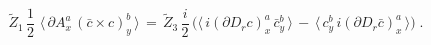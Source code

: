 \begin{equation}
  \label{auxSTI}
  \widetilde Z_1 \,\frac{1}{2} \, \, \langle \, \partial
      A^a_x \, (\bar c \times c )^b_y \, \rangle  \, = \,
   \widetilde Z_3 \,
       \frac{i}{2} \, \Big( \langle  \, i (\partial D_r c)^a_x \, \bar c^b_y\,
  \rangle \,  - \,  \langle  \,  c^b_y\,  i(\partial D_r \bar c)^a_x \,
  \rangle \Big) \;.
\end{equation}

